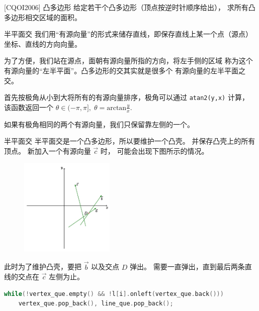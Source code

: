 \documentclass{beamer}
\begin{document}
\begin{frame}{[CQOI2006] 凸多边形}
    \small
    给定若干个凸多边形（顶点按逆时针顺序给出），
    求所有凸多边形相交区域的面积。

\end{frame}

\begin{frame}[fragile]{半平面交}
    \small
    我们用“有源向量”的形式来储存直线，即保存直线上某一个点（源点）坐标、直线的方向向量。

    \vspace{1em}
    为了方便，我们站在源点，面朝有源向量所指的方向，将左手侧的区域
    称为这个有源向量的“左半平面”。凸多边形的交其实就是很多个
    有源向量的左半平面之交。

    \vspace{1em}
    首先按极角从小到大将所有的有源向量排序，极角可以通过 \verb|atan2(y,x)| 计算，
    该函数返回一个 $\theta\in(-\pi,\pi],\;\theta=\text{arctan}\frac{y}{x}$.

    如果有极角相同的两个有源向量，我们只保留靠左侧的一个。
\end{frame}

\begin{frame}[fragile]{半平面交}
    \footnotesize
    半平面交是一个凸多边形，所以要维护一个凸壳。
    并保存凸壳上的所有顶点。
    新加入一个有源向量 $\overrightarrow{c}$ 时，
    可能会出现下图所示的情况。

    \begin{figure}[H]
        \centering
        \includegraphics[width=0.4\textwidth]{pic/halfplane_1.png}
    \end{figure}

    此时为了维护凸壳，要把 $\overrightarrow{b}$ 以及交点 $D$ 弹出。
    需要一直弹出，直到最后两条直线的交点在 $\overrightarrow{c}$ 左侧为止。

    \pause
    \begin{lstlisting}[language=c++]
while(!vertex_que.empty() && !l[i].onleft(vertex_que.back()))
    vertex_que.pop_back(), line_que.pop_back();
    \end{lstlisting}
\end{frame}
\end{document}
